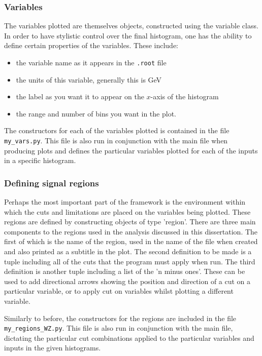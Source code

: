 \subsubsection{Variables}
The variables plotted are themselves objects, constructed using the variable class. 
In order to have stylistic control over the final histogram, one has the ability to define certain properties of the variables.
These include:
\begin{itemize}
\item the variable name as it appears in the \texttt{.root} file
\item the units of this variable, generally this is GeV
\item the label as you want it to appear on the $x$-axis of the histogram
\item the range and number of bins you want in the plot.
\end{itemize}

\noindent The constructors for each of the variables plotted is contained in the file \texttt{my\_vars.py}.
This file is also run in conjunction with the main file when producing plots and defines the particular variables plotted for each of the inputs in a specific histogram.

\subsubsection{Defining signal regions}
Perhaps the most important part of the framework is the environment within which the cuts and limitations are placed on the variables being plotted.
These regions are defined by constructing objects of type 'region'.
There are three main components to the regions used in the analysis discussed in this dissertation.
The first of which is the name of the region, used in the name of the file when created and also printed as a subtitle in the plot.
The second definition to be made is a tuple including all of the cuts that the program must apply when run.
The third definition is another tuple including a list of the 'n minus ones'.
These can be used to add directional arrows showing the position and direction of a cut on a particular variable, or to apply cut on variables whilst plotting a different variable.

Similarly to before, the constructors for the regions are included in the file \texttt{my\_regions\_WZ.py}.
This file is also run in conjunction with the main file, dictating the particular cut combinations applied to the particular variables and inputs in the given histograms.

